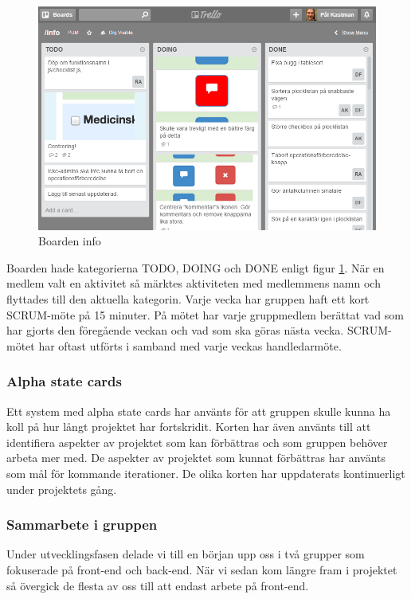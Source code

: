 \documentclass{article}
\begin{document}
\begin{figure}[htbp]
	\begin{center}
	\includegraphics[scale=0.5]{trello2.png}
	\caption{Boarden info}
	\label{fig:trello2}
	\end{center}
\end{figure}


Boarden hade kategorierna TODO, DOING och DONE enligt figur \ref{fig:trello2}. När en medlem valt en aktivitet så märktes aktiviteten med medlemmens namn och flyttades till den aktuella kategorin. Varje vecka har gruppen haft ett kort SCRUM-möte på 15 minuter. På mötet har varje gruppmedlem berättat vad som har gjorts den föregående veckan och vad som ska göras nästa vecka. SCRUM-mötet har oftast utförts i samband med varje veckas handledarmöte.

\subsubsection{Alpha state cards}
Ett system med alpha state cards har använts för att gruppen skulle kunna ha koll på hur långt projektet har fortskridit. Korten har även använts till att identifiera aspekter av projektet som kan förbättras och som gruppen behöver arbeta mer med. De aspekter av projektet som kunnat förbättras har använts som mål för kommande iterationer. De olika korten har uppdaterats kontinuerligt under projektets gång.

\subsubsection{Sammarbete i gruppen}
Under utvecklingsfasen delade vi till en början upp oss i två grupper som fokuserade på front-end och back-end. När vi sedan kom längre fram i projektet så övergick de flesta av oss till att endast arbete på front-end.
\end{document}
